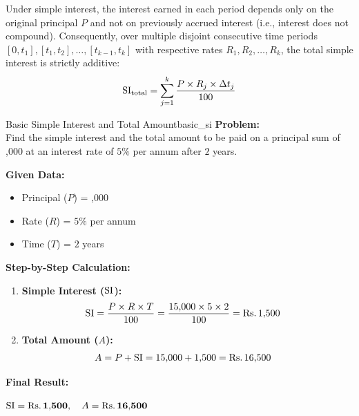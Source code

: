\begin{remarkbox}
Under simple interest, the interest earned in each period depends only on the original principal $P$ and not on previously accrued interest (i.e., interest does not compound). Consequently, over multiple disjoint consecutive time periods $[0, t_1], [t_1, t_2], \dots, [t_{k-1}, t_k]$ with respective rates $R_1, R_2, \dots, R_k$, the total simple interest is strictly additive:
\begin{equation}
    \operatorname{SI}_{\text{total}} = \sum_{j=1}^{k} \frac{P \times R_j \times \Delta t_j}{100}
\end{equation}
\end{remarkbox}

\begin{example}{Basic Simple Interest and Total Amount}{basic_si}
\textbf{Problem:} \\
Find the simple interest and the total amount to be paid on a principal sum of ,000 at an interest rate of $5\%$ per annum after $2$ years.

\tcbline
\textbf{Given Data:}
\begin{itemize}[noitemsep]
    \item Principal ($P$) = ,000
    \item Rate ($R$) = $5\%$ per annum
    \item Time ($T$) = $2$ years
\end{itemize}

\textbf{Step-by-Step Calculation:}
\begin{enumerate}[leftmargin=*]
    \item \textbf{Simple Interest ($\operatorname{SI}$):}
    \begin{align*}
        \operatorname{SI} &= \frac{P \times R \times T}{100} = \frac{15{,}000 \times 5 \times 2}{100} = \text{Rs.}\, 1{,}500
    \end{align*}
    
    \item \textbf{Total Amount ($A$):}
    \begin{align*}
        A &= P + \operatorname{SI} = 15{,}000 + 1{,}500 = \text{Rs.}\, 16{,}500
    \end{align*}
\end{enumerate}

\textbf{Final Result:}
\begin{center}
    $\operatorname{SI} = \mathbf{\text{Rs.}\, 1{,}500}, \quad A = \mathbf{\text{Rs.}\, 16{,}500}$
\end{center}
\end{example}

